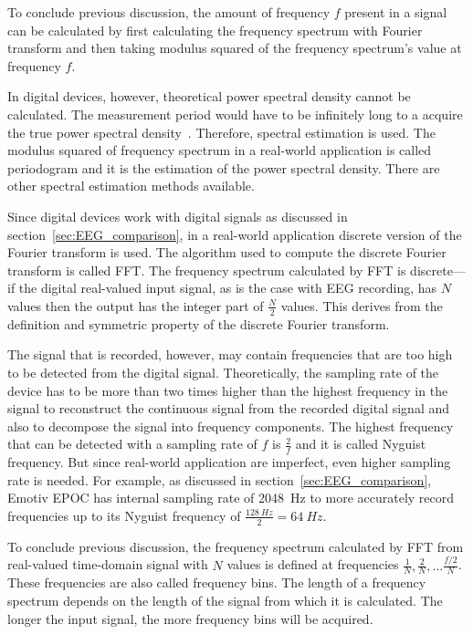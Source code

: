 To conclude previous discussion, the amount of frequency $f$ present in a signal can be calculated by first calculating the \gls{frequency spectrum} with \gls{Fourier transform} and then taking modulus squared of the \gls{frequency spectrum}'s value at frequency $f$.

In digital devices, however, theoretical \gls{power spectral density} cannot be calculated. The measurement period would have to be infinitely long to a acquire the true \gls{power spectral density}~\cite{psd}. Therefore, spectral estimation is used. The modulus squared of frequency spectrum in a real-world application is called \gls{periodogram} and it is the estimation of the \gls{power spectral density}. There are other spectral estimation methods available.

Since digital devices work with \glspl{digital signal} as discussed in section~\ref{sec:EEG_comparison}, in a real-world application discrete version of the \gls{Fourier transform} is used. The algorithm used to compute the discrete \gls{Fourier transform} is called \gls{FFT}. The \gls{frequency spectrum} calculated by \gls{FFT} is discrete---if the digital real-valued input signal, as is the case with \gls{EEG} recording, has $N$ values then the output has the integer part of $\frac{N}{2}$ values. This derives from the definition and symmetric property of the discrete \gls{Fourier transform}. %

The signal that is recorded, however, may contain frequencies that are too high to be detected from the \gls{digital signal}. Theoretically, the \gls{sampling rate} of the device has to be more than two times higher than the highest frequency in the signal to reconstruct the continuous signal from the recorded \gls{digital signal} and also to decompose the signal into \glspl{frequency component}. The highest frequency that can be detected with a \gls{sampling rate} of $f$ is $\frac{2}{f}$ and it is called \gls{Nyguist frequency}. But since real-world application are imperfect, even higher \gls{sampling rate} is needed. For example, as discussed in section~\ref{sec:EEG_comparison}, Emotiv EPOC has internal \gls{sampling rate} of \SI{2048}{Hz} to more accurately record frequencies up to its \gls{Nyguist frequency} of $\frac{\SI{128}{Hz}}{2}=\SI{64}{Hz}$.

To conclude previous discussion, the \gls{frequency spectrum} calculated by \gls{FFT} from real-valued time-domain signal with $N$ values is defined at frequencies $\frac{1}{N}, \frac{2}{N}, \dots\frac{f/2}{N}$. These frequencies are also called \glspl{frequency bin}. The length of a \gls{frequency spectrum} depends on the length of the signal from which it is calculated. The longer the input signal, the more \glspl{frequency bin} will be acquired.

